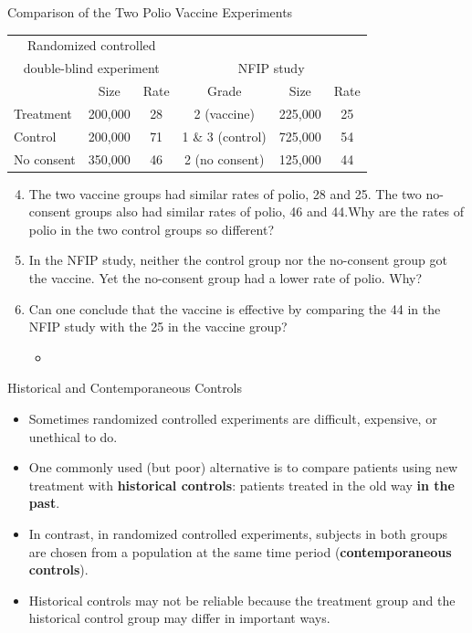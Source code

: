 \documentclass[
  ignorenonframetext, 10pt
]{beamer}
\providecommand{\tightlist}{%
  \setlength{\itemsep}{0pt}\setlength{\parskip}{0pt}}
\begin{document}
\begin{frame}{Comparison of the Two Polio Vaccine Experiments}
\protect\hypertarget{comparison-of-the-two-polio-vaccine-experiments}{}
\begin{center}
\tabcolsep=3pt
\begin{tabular}{lcc||ccc}
\multicolumn{3}{c||}{Randomized controlled} &\\
\multicolumn{3}{c||}{double-blind experiment} &
\multicolumn{3}{c}{NFIP study} \\\hline
 & Size & Rate &  Grade & Size & Rate \\
Treatment  & 200,000 & 28 &  2 (vaccine) & 225,000 & 25 \\
Control    & 200,000 & 71 &  1 \& 3 (control) & 725,000 & 54 \\
No consent & 350,000 & 46 &  2 (no consent) & 125,000 & 44
\end{tabular}
\end{center}

\begin{enumerate}
\setcounter{enumi}{3}
\item
  The two vaccine groups had similar rates of polio, 28 and 25. \newline
  The two no-consent groups also had similar rates of polio, 46 and
  44.\newline Why are the rates of polio in the two control groups so
  different?
\item
  In the NFIP study, neither the control group nor the no-consent group
  got the vaccine. Yet the no-consent group had a lower rate of polio.
  Why?\medskip
\item
  Can one conclude that the vaccine is effective by comparing the 44 in
  the NFIP study with the 25 in the vaccine group?

  \begin{itemize}
  \item
  \end{itemize}
\end{enumerate}
\end{frame}

\begin{frame}{Historical and Contemporaneous Controls}
\protect\hypertarget{historical-and-contemporaneous-controls}{}
\begin{itemize}
\tightlist
\item
  Sometimes randomized controlled experiments are difficult, expensive,
  or unethical to do.
\item
  One commonly used (but poor) alternative is to compare patients using
  new treatment with \textbf{historical controls}: patients treated in
  the old way \textbf{in the past}.
\item
  In contrast, in randomized controlled experiments, subjects in both
  groups are chosen from a population at the same time period
  (\textbf{contemporaneous controls}).
\item
  Historical controls may not be reliable because the treatment group
  and the historical control group may differ in important ways.
\end{itemize}
\end{frame}
\end{document}
